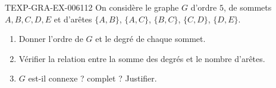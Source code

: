 \begin{exercice}{TEXP-GRA-EX-006}{1}{12}
On considère le graphe $G$ d'ordre $5$, de sommets $A,B,C,D,E$ et d'arêtes
$\{A,B\}$, $\{A,C\}$, $\{B,C\}$, $\{C,D\}$, $\{D,E\}$.
\begin{enumerate}
  \item Donner l'ordre de $G$ et le degré de chaque sommet.
  \item Vérifier la relation entre la somme des degrés et le nombre d'arêtes.
  \item $G$ est-il connexe ? complet ? Justifier.
\end{enumerate}
\end{exercice}
